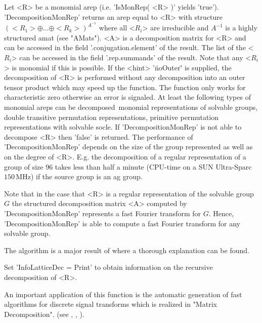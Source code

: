 Let <R> be a monomial arep (i.e. 'IsMonRep( <R> )' yields 'true'). 
'DecompositionMonRep' returns an arep equal to <R> with 
structure $(<R_1>\oplus\dots\oplus <R_k>)^{A^{-1}}$ where all
<$R_i$> are irreducible and $A^{-1}$ is a highly structured 
amat (see "AMats"). <A> is a decomposition matrix for <R> and 
can be accessed in the field '.conjugation.element' of the result.
The list of the <$R_i$> can be accessed in the field
'.rep.summands' of the result. Note that any <$R_i$> is monomial if
this is possible.
If the <hint> '\"noOuter\"' is supplied, the decomposition
of <R> is performed without any decomposition into 
an outer tensor product which may speed up the function.
The function only works for characteristic zero otherwise an error
is signaled. 
At least the following types of monomial areps can be decomposed\:\ 
monomial representations of solvable groups, double transitive
permutation representations, primitive permutation representations
with solvable socle.
If 'DecompositionMonRep' is not able to decompose <R> then 'false' is
returned.
The performance of 'DecompositionMonRep' depends on the size of the 
group represented as well as on the degree of <R>. E.g. the 
decomposition of a regular representation of a group of size 96 
takes less than half a minute 
(CPU-time on a SUN Ultra-Sparc $150\,\mathrm{MHz}$) if the 
source group is an ag group.
 
Note that in the case that <R> is a regular representation of the
solvable group $G$ the structured decomposition matrix <A> computed by
'DecompositionMonRep' represents a fast Fourier transform for $G$. 
Hence, 'DecompositionMonRep' is able to compute a fast Fourier
transform for any solvable group.

The algorithm is a major result of \cite{Pue98} where a thorough
explanation can be found.

Set 'InfoLatticeDec \:= Print' to obtain information on 
the recursive decomposition of <R>.

An important application of this function is the automatic generation
of fast algorithms for discrete signal transforms which is realized
in "Matrix Decomposition".
(see \cite{Min93}, \cite{Egn97}, \cite{Pue98}).


